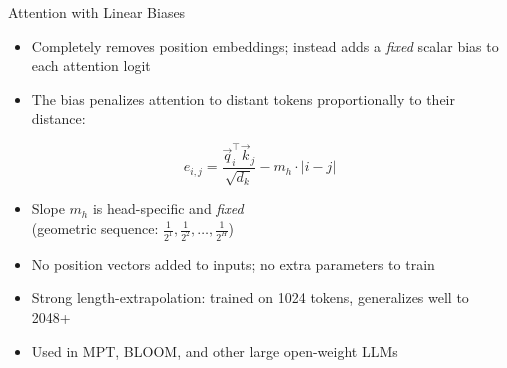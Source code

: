 \documentclass[11pt,compress,t,notes=noshow, xcolor=table]{beamer}
\begin{document}
\begin{frame}{Attention with Linear Biases}

\vfill

\begin{itemize}
\item Completely removes position embeddings; instead adds a \textit{fixed} scalar bias to each attention logit
\item The bias penalizes attention to distant tokens proportionally to their distance:
\end{itemize}

\begin{equation*}
e_{i,j} = \frac{\vec q_i^\top \vec k_j}{\sqrt{d_k}} - m_h \cdot |i - j|
\end{equation*}

\begin{itemize}
\item Slope $m_h$ is head-specific and \textit{fixed}\\(geometric sequence: $\frac{1}{2^1}, \frac{1}{2^2}, \ldots, \frac{1}{2^H}$)
\item No position vectors added to inputs; no extra parameters to train
\item Strong length-extrapolation: trained on 1024 tokens, generalizes well to 2048+
\item Used in MPT, BLOOM, and other large open-weight LLMs
\end{itemize}

\vfill

\end{frame}

\end{document}
